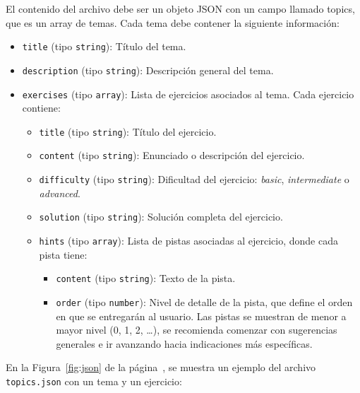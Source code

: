 El contenido del archivo debe ser un objeto JSON con un campo llamado topics, que es un array de temas. Cada tema debe contener la siguiente información:
\begin{itemize}
    \item \texttt{title} (tipo \texttt{string}): Título del tema.
    \item \texttt{description} (tipo \texttt{string}): Descripción general del tema.
    \item \texttt{exercises} (tipo \texttt{array}): Lista de ejercicios asociados al tema. Cada ejercicio contiene:
    \begin{itemize}
        \item \texttt{title} (tipo \texttt{string}): Título del ejercicio.
        \item \texttt{content} (tipo \texttt{string}): Enunciado o descripción del ejercicio.
        \item \texttt{difficulty} (tipo \texttt{string}): Dificultad del ejercicio: \textit{basic}, \textit{intermediate} o \textit{advanced}.
        \item \texttt{solution} (tipo \texttt{string}): Solución completa del ejercicio.
        \item \texttt{hints} (tipo \texttt{array}): Lista de pistas asociadas al ejercicio, donde cada pista tiene:
        \begin{itemize}
            \item \texttt{content} (tipo \texttt{string}): Texto de la pista.
            \item \texttt{order} (tipo \texttt{number}): Nivel de detalle de la pista, que define el orden en que se entregarán al usuario. Las pistas se muestran de menor a mayor nivel (0, 1, 2, \ldots), se recomienda comenzar con sugerencias generales e ir avanzando hacia indicaciones más específicas.
        \end{itemize}
    \end{itemize}
\end{itemize}

En la Figura~\ref{fig:json} de la página~\pageref{fig:json}, se muestra un ejemplo del archivo \texttt{topics.json} con un tema y un ejercicio:

